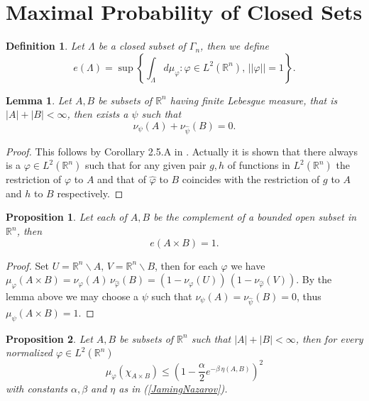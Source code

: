 \documentclass[12pt,a4paper,draft]{article}
\newcommand{\RR}[1]{\mathbb{R}^#1}
\newtheorem{lemma}{Lemma}
\newtheorem{prop}{Proposition}
\newtheorem{definition}{Definition}
\begin{document}
\section{Maximal Probability of Closed Sets}
\begin{definition}
Let $\Lambda$ be a closed subset of $\Gamma_n$, then we define
\begin{equation}
     e(\Lambda) = \sup \left\{ \int_{\Lambda} d\mu_{\varphi} : 
                     \varphi\in L^2(\RR n), \, ||\varphi|| = 1 \right\}.
\end{equation}
\end{definition}

\begin{lemma}
Let $A,B$ be subsets of $\RR n$ having finite Lebesgue measure, that is $|A|+|B|<\infty$, then exists a $\psi$ such that 
\begin{equation}
          \nu_{\psi}(A)+\nu_{\hat\psi}(B) = 0.
\end{equation}
\end{lemma}

\begin{proof}
This follows by Corollary 2.5.A in \cite{havin_uncertainty_2012}. Actually it is
shown that there always is a $\varphi\in L^2(\RR n)$ such that for any given pair
$g,h$ of functions in $L^2(\RR n)$ the restriction of $\varphi$ to $A$ and that
of $\hat\varphi$ to $B$ coincides with the restriction of $g$ to $A$ and
$h$ to $B$ respectively. 
\end{proof}

\begin{prop}
Let each of $A,B$ be the complement of a bounded open subset in $\RR n$, then 
\begin{displaymath}
       e(A\times B) = 1.
\end{displaymath}
\end{prop}

\begin{proof}
Set $U={\RR n}\backslash A,\, V={\RR n}\backslash B$, then for each $\varphi$ we 
have $\mu_{\varphi}(A\times B)=\nu_{\varphi}(A)\,
\nu_{\hat\varphi}(B)=(1-\nu_{\varphi}(U))\, (1-\nu_{\hat\varphi}(V))$. By 
the lemma above we may choose a $\psi$ such that 
$\nu_{\psi}(A)=\nu_{\hat\psi}(B) = 0$, thus $\mu_{\psi}(A\times B)=1$.
\end{proof}

\begin{prop}
Let $A,B$ be subsets of $\RR n$ such that $|A|+|B|<\infty$, then for every 
normalized $\varphi\in L^2(\RR n)$
\begin{equation}\label{eUbound}
   \mu_{\varphi}(\chi_{A\times B}) \leq 
      \left( 1-\frac{\alpha}{2} e^{-\beta\, \eta(A,B)} \right)^2
\end{equation}
with constants $\alpha,\beta$ and $\eta$ as in (\ref{JamingNazarov}). 
\end{prop}
\end{document}
